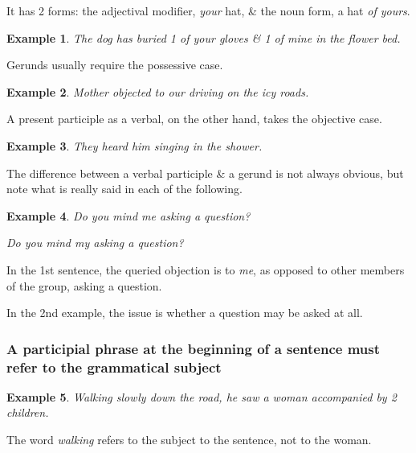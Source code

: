 \documentclass{article}
\newtheorem{example}{Example}
\begin{document}
It has 2 forms: the adjectival modifier, {\it your} hat, \& the noun form, a hat {\it of yours}.
\begin{example}
	The dog has buried 1 of your gloves \& 1 of mine in the flower bed.
\end{example}
Gerunds usually require the possessive case.
\begin{example}
	Mother objected to our driving on the icy roads.
\end{example}
A present participle as a verbal, on the other hand, takes the objective case.
\begin{example}
	They heard him singing in the shower.
\end{example}
The difference between a verbal participle \& a gerund is not always obvious, but note what is really said in each of the following.
\begin{example}
	Do you mind me asking a question?
	
	Do you mind my asking a question?
\end{example}
In the 1st sentence, the queried objection is to {\it me}, as opposed to other members of the group, asking a question.

In the 2nd example, the issue is whether a question may be asked at all.


\subsubsection{A participial phrase at the beginning of a sentence must refer to the grammatical subject}
\begin{example}
	Walking slowly down the road, he saw a woman accompanied by 2 children.
\end{example}
The word {\it walking} refers to the subject to the sentence, not to the woman.
\end{document}
